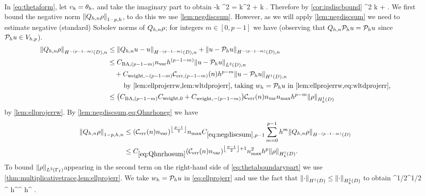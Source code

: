 In \cref{eq:thetaform}, let $v_{h} = \theta_{h},$ and take the imaginary part to obtain
\beq\label{eq:boundboundarybelow}
-k \NLtGI{\thetah}^2 = \Im k^2 \IPLtDn{\Qhn \rho}{\thetah} + \Re k \IPLtGI{\rho}{\thetah}.
\eeq
Therefore by \cref{cor:ipdiscbound}
\beq
\NLtGI{\thetah}^2 \leq  k  + \NLtGI{\rho}\NLtGI{\thetah}.\label{eq:thetaboundarypart}
\eeq
We first bound the negative norm $\Nfn{1-p,h}{\Qhn\rho}$, to do this we use \cref{lem:negdiscsum}. However, as we will apply \cref{lem:negdiscsum} we need to estimate negative (standard) Sobolev norms of $Q_{h,n}\rho$; for integers $m \in [0,p-1]$ we have (observing that $Q_{h,n} \mathcal P_{h} u = \mathcal P_{h} u$ since $\mathcal P_{h} u \in V_{h,p}$).
\begin{align}
\NHnfn{-(p-1-m)}{D}{\Qhn\rho} &\leq \NHnfn{-(p-1-m)}{D}{\Qhn u - u} + \NHnfn{-(p-1-m)}{D}{u - \Ph u}\nonumber\\
&\leq \CSZfn{(p-1-m)} \nvar h^{(p-1-m)} \NLtDn{u-\Ph u}\nonumber\\
&\quad+ \Cwfn{-(p-1-m)}\errn{(p-1-m)} h^{p-m} \NHoDn{u - \Ph u}\nonumber\\
&\quad\quad\text{ by \cref{lem:ellprojerrw,lem:wltdprojerr}, taking } \wh = \Ph u \text{ in \cref{lem:ellprojerrw,eq:wltdprojerr},}\nonumber\\
&\leq \mleft(\CSZfn{(p-1-m)} \Cwz + \Cwfn{-(p-1-m)}\mright)\En\nvar\nmax h^{p-m} \NHokD{\rho}\label{eq:Qhnrhoneg}
\end{align}
by \cref{lem:ellprojerrw}. By \cref{lem:negdiscsum,eq:Qhnrhoneg} we have
\begin{align}
\Nfn{1-p,h,n}{\Qhn \rho}&\leq \mleft(\En\nvar\mright)^{\floor{\frac{p-1}2}}\nmax \Csumfn{p-1} \sum_{m=0}^{p-1} h^{m} \NHfn{-(p-1-m)}{D}{\Qhn \rho} \nonumber\\
&\leq \Cmess \mleft(\En\nvar\mright)^{\floor{\frac{p-1}2}+1}\nmax^2 h^p \NHokD{\rho}.\label{eq:Qhnrhosum}
\end{align}
To bound $\NLtGI{\rho}$appearing in  the second term on the right-hand side of \cref{eq:thetaboundarypart} we use \cref{thm:multiplicativetrace,lem:ellprojerr}. We take $w_{h} = \mathcal P_{h} u$ in \cref{eq:ellprojerr} and use the fact that $\NHoD{\cdot} \leq \NHokD{\cdot}$ to obtain
\beq\label{eq:rhomtbound}
\NLtGI{\rho} \leq \CMT\NHoD{\rho}^{1/2}\NLtD{\rho}^{1/2} \leq \CMT {}^{\half} h^\half \NHoD{\rho}\leq \CMT {}^{\half} h^{\half} \NHokD{\rho}.
